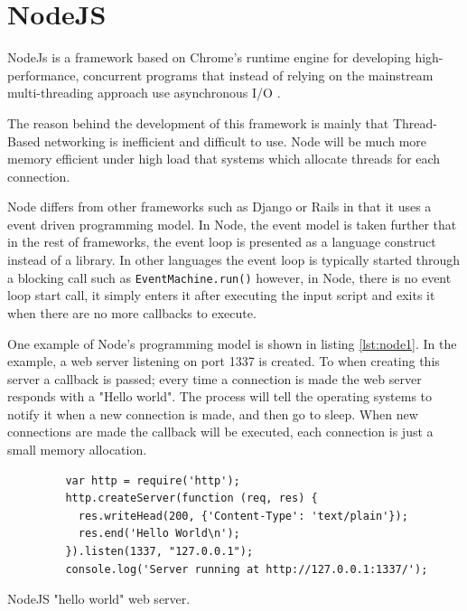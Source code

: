 \section{NodeJS}

NodeJs is a framework based on Chrome's runtime engine \cite{v8} for developing high-performance, concurrent programs that instead of relying on the mainstream multi-threading approach use asynchronous I/O \cite{tilkov2010node}.

The reason behind the development of this framework is mainly that Thread-Based networking is inefficient and difficult to use. Node will be much more memory efficient under high load that systems which allocate threads for each connection.

Node differs from other frameworks such as Django or Rails in that it uses a event driven programming model. In Node, the event model is taken further that in the rest of frameworks, the event loop is presented as a language construct instead of a library. In other languages the event loop is typically started through a blocking call such as \texttt{EventMachine.run()} however, in Node, there is no event loop start call, it simply enters it after executing the input script and exits it when there are no more callbacks to execute.

One example of Node's programming model is shown in listing \ref{lst:node1}. In the example, a web server listening on port 1337 is created. To when creating this server a callback is passed; every time a connection is made the web server responds with a "Hello world". The process will tell the operating systems to notify it when a new connection is made, and then go to sleep. When new connections are made the callback will be executed, each connection is just a small memory allocation.

\begin{listing}[ht]\centering
  \begin{minipage}{.6\textwidth}
    \begin{verbatim}
	     var http = require('http');
	     http.createServer(function (req, res) {
	       res.writeHead(200, {'Content-Type': 'text/plain'});
	       res.end('Hello World\n');
	     }).listen(1337, "127.0.0.1");
	     console.log('Server running at http://127.0.0.1:1337/');
    \end{verbatim}
  \end{minipage}
  \caption{NodeJS "hello world" web server.}\label{lst:node1}
\end{listing}

